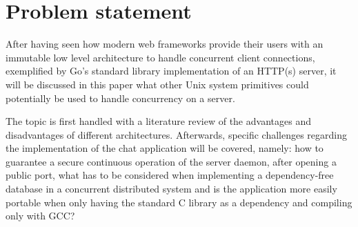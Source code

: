 \section{Problem statement}
After having seen how modern web frameworks provide their users with an immutable low level architecture to handle concurrent client connections, exemplified by Go's standard library implementation of an HTTP(s) server, it will be discussed in this paper what other Unix system primitives could potentially be used to handle concurrency on a server.

The topic is first handled with a literature review of the advantages and disadvantages of different architectures. Afterwards, specific challenges regarding the implementation of the chat application will be covered, namely: how to guarantee a secure continuous operation of the server daemon, after opening a public port, what has to be considered when implementing a dependency-free database in a concurrent distributed system and is the application more easily portable when only having the standard C library as a dependency and compiling only with GCC?
